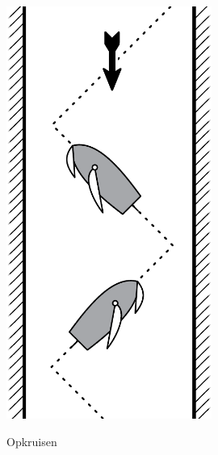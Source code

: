 \begin{figure}[h]
	\centering
	\begin{minipage}{0.40\textwidth}
		\centering
		\includegraphics[width=0.6\textwidth]{Hoofdstukken/Onderdelen/pdf/opkruisen.pdf}
		\caption{Opkruisen}
		\centering
		\label{pic:opkruisen}
	\end{minipage}
	\begin{minipage}{0.40\textwidth}
		\centering

\end{minipage}
\end{figure}
